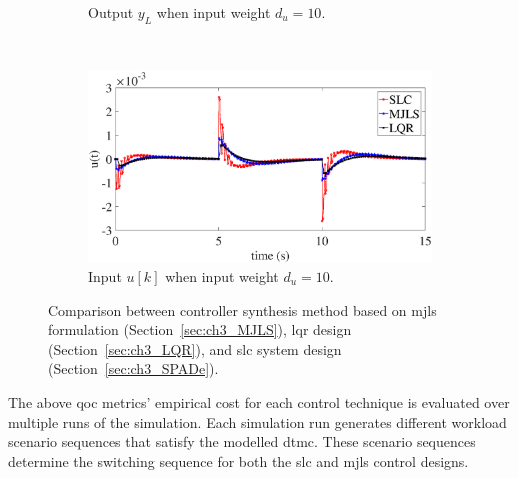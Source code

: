 \begin{figure}[t!]
\begin{subfigure}[t]{0.5\textwidth}
        \caption{Output $y_L$ when input weight $d_u=10$.}
    \end{subfigure}%
    ~
    \begin{subfigure}[t]{0.5\textwidth}
        \centering
       \includegraphics[width=\textwidth]{images/res_u_R10.eps}
       \caption{Input $u[k]$ when input weight $d_u=10$.}
    \end{subfigure}
    \caption{Comparison between controller synthesis method based on \gls{mjls} formulation (Section~\ref{sec:ch3_MJLS}), \gls{lqr} design (Section~\ref{sec:ch3_LQR}), and \gls{slc} system design (Section~\ref{sec:ch3_SPADe}). }
    \label{fig:ch3_results}
   \vspace{-2em}
\end{figure}
The above \gls{qoc} metrics' empirical cost for each control technique is evaluated over multiple runs of the simulation. Each simulation run generates different workload scenario sequences that satisfy the modelled \gls{dtmc}. These scenario sequences determine the switching sequence for both the \gls{slc} and \gls{mjls} control designs.


